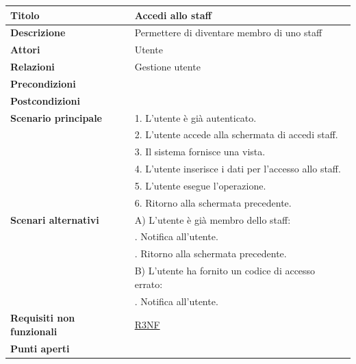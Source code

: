 \documentclass[a4paper]{article}
\begin{document}
\begin{center}
\begin{tabularx}{1\textwidth}{|l|X|}
    \hline
	\textbf{Titolo} & Accedi allo staff \\
	\hline
	\textbf{Descrizione} & Permettere di diventare membro di uno staff \\
	\hline
	\textbf{Attori} & Utente \\
	\hline
	\textbf{Relazioni} & Gestione utente\\
	\hline
	\textbf{Precondizioni} &  \\
	\hline
	\textbf{Postcondizioni} &  \\
	\hline
	\textbf{Scenario principale} & 1. L'utente è già autenticato.\\
	                             & 2. L'utente accede alla schermata di accedi staff. \\
								 & 3. Il sistema fornisce una vista. \\
								 & 4. L'utente inserisce i dati per l'accesso allo staff. \\
								 & 5. L'utente esegue l'operazione.\\
								 & 6. Ritorno alla schermata precedente.\\
	\hline
	\textbf{Scenari alternativi} & A) L'utente è già membro dello staff:\\
								 & \quad 1. Notifica all'utente.\\
								 & \quad 2. Ritorno alla schermata precedente.\\
								 & B) L'utente ha fornito un codice di accesso errato:\\
								 & \quad 1. Notifica all'utente.\\
	\hline
	\textbf{Requisiti non funzionali} & \hyperlink{R3NF}{R3NF} \\
	\hline
	\textbf{Punti aperti} & \\
	\hline
\end{tabularx}
\end{center}


\end{document}
